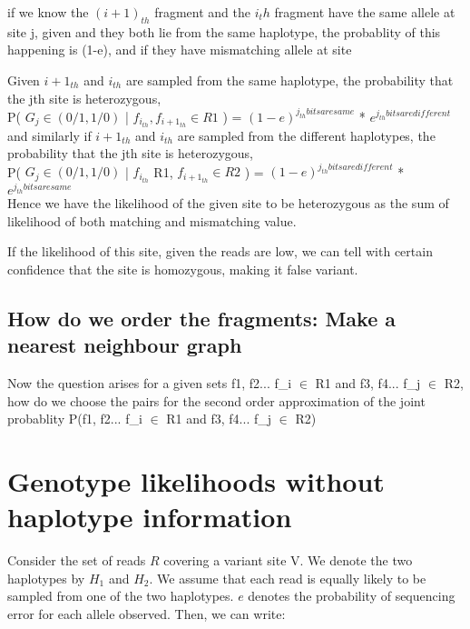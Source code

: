 \documentclass[9pt]{osa-supplemental-document}
\begin{document}
if we know the $(i+1)_{th}$ fragment and the $i_th$ fragment have the same allele at site j, given and they both lie from the same haplotype, the probablity of this happening is (1-e), and if they have mismatching allele at site 

Given $i+1_{th}$ and $i_{th}$ are sampled from the same haplotype, the probability that the jth site is heterozygous,  \\

P( $G_j \in (0/1, 1/0) $ | $f_{i_{th}}, f_{i+1_{th}} \in R1$ ) = $(1-e)^{j_{th} bits are same}$ * $e^{j_{th} bits are different}$ \\

and similarly if $i+1_{th}$ and $i_{th}$ are sampled from the different haplotypes, the probability that the jth site is heterozygous,  \\

P( $G_j \in (0/1, 1/0) $ | $f_{i_{th}}$ \in R1, $f_{i+1_{th}} \in R2$ ) = $(1-e)^{j_{th} bits are different}$ * $e^{j_{th} bits are same}$\\

Hence we have the likelihood of the given site to be heterozygous as 
the sum of likelihood of both matching and mismatching value.

If the likelihood of this site, given the reads are low, we can tell with certain confidence that the site is homozygous, making it false variant.

\subsection{How do we order the fragments: Make a nearest neighbour graph}


Now the question arises for a given sets {f1, f2... f_{i}} $\in$ R1 and {f3, f4... f_{j}} $\in$ R2, how do we choose the pairs for the second order approximation of the joint probablity P({f1, f2... f_{i}} $\in$ R1 and {f3, f4... f_{j}} $\in$ R2)


\clearpage
\section{Genotype likelihoods without haplotype information}
Consider the set of reads $R$ covering a variant site V. We denote the two haplotypes by $H_1$ and $H_2$. We assume that each read is equally likely to be sampled from one of the two haplotypes. $e$ denotes the probability of sequencing error for each allele observed. Then, we can write:
\end{document}
